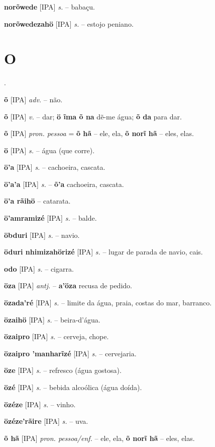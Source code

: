 \textbf{norõwede} [IPA] \textit{s.} -- babaçu.

\textbf{norõwedezahö} [IPA] \textit{s.} -- estojo peniano.


\section*{O}.


\textbf{õ} [IPA] \textit{adv.} -- não.

\textbf{õ} [IPA] \textit{v.} -- dar; \textbf{ö ĩma õ na} dẽ-me água; \textbf{õ da} para dar.

\textbf{õ} [IPA] \textit{pron. pessoa} = \textbf{õ hã} -- ele, ela, \textbf{õ norĩ hã} -- eles, elas.

\textbf{ö} [IPA] \textit{s.} -- água (que corre).

\textbf{ö'a} [IPA] \textit{s.} -- cachoeira, cascata.

\textbf{ö'a'a} [IPA] \textit{s.} -- \textbf{õ'a} cachoeira, cascata.

\textbf{ö'a rãihö} -- catarata.

\textbf{ö'amramizé} [IPA] \textit{s.} -- balde.

\textbf{öbduri} [IPA] \textit{s.} -- navio.

\textbf{öduri nhimizahörizé} [IPA] \textit{s.} -- lugar de parada de navio, cais.

\textbf{odo} [IPA] \textit{s.} -- cigarra.



\textbf{öza} [IPA] \textit{antj.} -- \textbf{a'öza} recusa de pedido.

\textbf{özada'ré} [IPA] \textit{s.} -- limite da água, praia, costas do mar, barranco.

\textbf{özaihö} [IPA] \textit{s.} -- beira-d'água.

\textbf{özaipro} [IPA] \textit{s.} -- cerveja, chope.

\textbf{özaipro 'manharĩzé} [IPA] \textit{s.} -- cervejaria.

\textbf{öze} [IPA] \textit{s.} -- refresco (água gostosa).

\textbf{özé} [IPA] \textit{s.} -- bebida alcoólica (água doída).

\textbf{özéze} [IPA] \textit{s.} -- vinho.

\textbf{özéze'rãire} [IPA] \textit{s.} -- uva.

\textbf{õ hã} [IPA] \textit{pron. pessoa/enf.} -- ele, ela, \textbf{õ norĩ hã} -- eles, elas.

